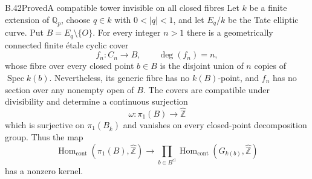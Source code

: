 \begin{statement}{B.42}{Proved}{A compatible tower invisible on all closed fibres}
Let $k$ be a finite extension of $\mathbb Q_p$,
choose $q\in k$ with $0<|q|<1$, and let $E_q/k$
be the Tate elliptic curve. Put $B=E_q\setminus\{O\}$.
For every integer $n>1$ there is a geometrically
connected finite \'etale cyclic cover
\[
 f_n:C_n\longrightarrow B,\qquad \deg(f_n)=n,
 \tag{B.42.1}
\]
whose fibre over every closed point $b\in B$ is
the disjoint union of $n$ copies of
$\operatorname{Spec}k(b)$. Nevertheless, its
generic fibre has no $k(B)$-point, and $f_n$
has no section over any nonempty open of $B$.
The covers are compatible under divisibility
and determine a continuous surjection
\[
 \omega:\pi_1(B)\longrightarrow\widehat{\mathbb Z}
 \tag{B.42.2}
\]
which is surjective on $\pi_1(B_{\bar k})$
and vanishes on every closed-point decomposition
group. Thus the map
\[
 \operatorname{Hom}_{\mathrm{cont}}
       (\pi_1(B),\widehat{\mathbb Z})
 \longrightarrow
 \prod_{b\in B^{\mathrm{cl}}}
 \operatorname{Hom}_{\mathrm{cont}}
       (G_{k(b)},\widehat{\mathbb Z})
 \tag{B.42.3}
\]
has a nonzero kernel.
\end{statement}
